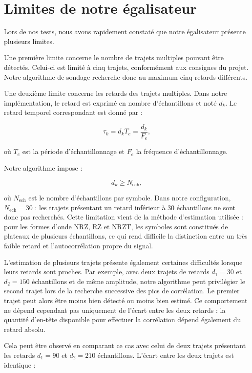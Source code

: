 \documentclass[a4paper,12pt]{report}
\begin{document}
\section{Limites de notre égalisateur}

Lors de nos tests, nous avons rapidement constaté que notre égalisateur présente plusieurs limites.

Une première limite concerne le nombre de trajets multiples pouvant être détectés. Celui-ci est limité à cinq trajets, conformément aux consignes du projet. Notre algorithme de sondage recherche donc au maximum cinq retards différents.

Une deuxième limite concerne les retards des trajets multiples. Dans notre implémentation, le retard est exprimé en nombre d'échantillons et noté $d_k$. Le retard temporel correspondant est donné par :

$$
\tau_k = d_k T_e = \frac{d_k}{F_e},
$$

où $T_e$ est la période d'échantillonnage et $F_e$ la fréquence d'échantillonnage.

Notre algorithme impose :

$$
d_k \geq N_{\mathrm{ech}},
$$

où $N_{\mathrm{ech}}$ est le nombre d'échantillons par symbole. Dans notre configuration, $N_{\mathrm{ech}}=30$ : les trajets présentant un retard inférieur à 30 échantillons ne sont donc pas recherchés. Cette limitation vient de la méthode d'estimation utilisée : pour les formes d'onde NRZ, RZ et NRZT, les symboles sont constitués de plateaux de plusieurs échantillons, ce qui rend difficile la distinction entre un très faible retard et l'autocorrélation propre du signal.

L'estimation de plusieurs trajets présente également certaines difficultés lorsque leurs retards sont proches. Par exemple, avec deux trajets de retards $d_1=30$ et $d_2=150$ échantillons et de même amplitude, notre algorithme peut privilégier le second trajet lors de la recherche successive des pics de corrélation. Le premier trajet peut alors être moins bien détecté ou moins bien estimé. Ce comportement ne dépend cependant pas uniquement de l'écart entre les deux retards : la quantité d'en-tête disponible pour effectuer la corrélation dépend également du retard absolu.

Cela peut être observé en comparant ce cas avec celui de deux trajets présentant les retards $d_1=90$ et $d_2=210$ échantillons. L'écart entre les deux trajets est identique :
\end{document}
